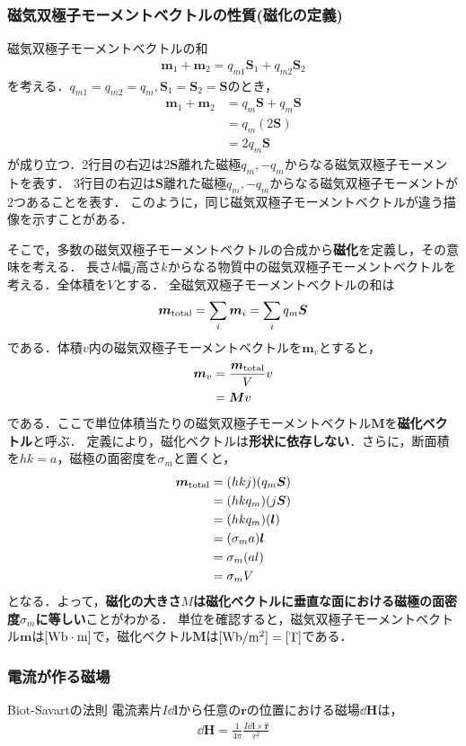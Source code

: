 \documentclass{report}
\begin{document}
  \subsubsection{磁気双極子モーメントベクトルの性質(磁化の定義)}
  磁気双極子モーメントベクトルの和
  \begin{align}
    \bm{m}_1 + \bm{m}_2 = q_{m1}\bm{S}_1 + q_{m2}\bm{S}_2
  \end{align}
  を考える．$q_{m1} = q_{m2} = q_m,\bm{S}_1 = \bm{S}_2 = \bm{S}$のとき，
  \begin{align}
    \bm{m}_1 + \bm{m}_2 &= q_m\bm{S} + q_m\bm{S}\\
    &= q_m(2\bm{S})\\
    &= 2q_m\bm{S}
  \end{align}
  が成り立つ．2行目の右辺は$2\bm{S}$離れた磁極$q_m,-q_m$からなる磁気双極子モーメントを表す．
  3行目の右辺は$\bm{S}$離れた磁極$q_m,-q_m$からなる磁気双極子モーメントが2つあることを表す．
  このように，同じ磁気双極子モーメントベクトルが違う描像を示すことがある．

  そこで，多数の磁気双極子モーメントベクトルの合成から\textbf{磁化}を定義し，その意味を考える．
  長さ$k$幅$j$高さ$k$からなる物質中の磁気双極子モーメントベクトルを考える．全体積を$V$とする．
  全磁気双極子モーメントベクトルの和は
  \begin{align}
    \bm{m}_{\mathrm{total}} = \sum_{i} \bm{m}_i = \sum_{i} q_m \bm{S}
  \end{align}
  である．体積$v$内の磁気双極子モーメントベクトルを$\bm{m}_v$とすると，
  \begin{align}
    \bm{m}_v &= \frac{\bm{m}_{\mathrm{total}}}{V}v\\
    &=\bm{M}v
  \end{align}
  である．ここで単位体積当たりの磁気双極子モーメントベクトル$\bm{M}$を\textbf{磁化ベクトル}と呼ぶ．
  定義により，磁化ベクトルは\textbf{形状に依存しない}．さらに，断面積を$hk=a$，磁極の面密度を$\sigma_m$と置くと，
  \begin{align}
    \bm{m}_{\mathrm{total}} &= (hkj)(q_m\bm{S})\\
    &= (hkq_m)(j\bm{S})\\
    &= (hkq_m)(\bm{l})\\
    &= (\sigma_m a)\bm{l}\\
    &= \sigma_m(al)\\
    &= \sigma_m V
  \end{align}
  となる．よって，\textbf{磁化の大きさ$M$は磁化ベクトルに垂直な面における磁極の面密度$\sigma_m$に等しい}ことがわかる．
  単位を確認すると，磁気双極子モーメントベクトル$\bm{m}$は$[\mathrm{Wb\cdot m}]$で，磁化ベクトル$\bm{M}$は$[\mathrm{Wb/m^2}]=[\mathrm{T}]$である．

  \subsubsection{電流が作る磁場}
  \begin{itembox}[l]{Biot-Savartの法則}
    電流素片$I\dd{\bm{l}}$から任意の$\bm{r}$の位置における磁場$\dd{\bm{H}}$は，
    \begin{align}
      \dd{\bm{H}} = \frac{1}{4\pi}\frac{I\dd{\bm{l}} \times \hat{\bm{r}}}{r^2}
    \end{align}
  \end{itembox}
\end{document}
